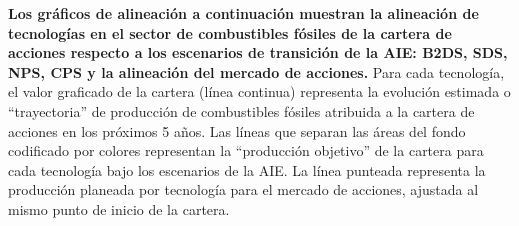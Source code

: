 \documentclass[10pt,table]{article}\usepackage[]{graphicx}\usepackage[]{color}
\begin{document}
	\begin{multicols}{2}
		\textbf{Los gráficos de alineación a continuación muestran la alineación de tecnologías en el sector de combustibles fósiles de la cartera de acciones respecto a los escenarios de transición de la AIE: B2DS, SDS, NPS, CPS y la alineación del mercado de acciones.   } 
		Para cada tecnología, el valor graficado de la cartera (línea continua) representa la evolución estimada o “trayectoria” de producción de combustibles fósiles atribuida a la cartera de acciones en los próximos 5 años.                
		Las líneas que separan las áreas del fondo codificado por colores representan la “producción objetivo” de la cartera para cada tecnología bajo los escenarios de la AIE. La línea punteada representa la producción planeada por tecnología para el mercado de acciones, ajustada al mismo punto de inicio de la cartera.
		
		
	\end{multicols}		
\end{document}
